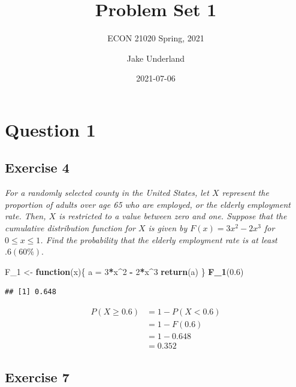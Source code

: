 \documentclass[
]{article}
\title{Problem Set 1}
\subtitle{ECON 21020 Spring, 2021}
\author{Jake Underland}
\date{2021-07-06}
\newenvironment{Shaded}{\begin{snugshade}}{\end{snugshade}}
\newcommand{\ControlFlowTok}[1]{\textcolor[rgb]{0.13,0.29,0.53}{\textbf{#1}}}
\newcommand{\DecValTok}[1]{\textcolor[rgb]{0.00,0.00,0.81}{#1}}
\newcommand{\FloatTok}[1]{\textcolor[rgb]{0.00,0.00,0.81}{#1}}
\newcommand{\KeywordTok}[1]{\textcolor[rgb]{0.13,0.29,0.53}{\textbf{#1}}}
\newcommand{\NormalTok}[1]{#1}
\newcommand{\OperatorTok}[1]{\textcolor[rgb]{0.81,0.36,0.00}{\textbf{#1}}}
\newcommand{\StringTok}[1]{\textcolor[rgb]{0.31,0.60,0.02}{#1}}
\begin{document}
\maketitle

{
\setcounter{tocdepth}{2}
\tableofcontents
}
\hypertarget{question-1}{%
\section{Question 1}\label{question-1}}

\hypertarget{exercise-4}{%
\subsection{Exercise 4}\label{exercise-4}}

\textit{For a randomly selected county in the United States, let $X$ represent the proportion of adults over age 65 who are employed, or the elderly employment rate. Then, $X$ is restricted to a value between zero and one. Suppose that the cumulative distribution function for $X$ is given by $F(x) = 3x^2 - 2x^3$ for $0 \leq x \leq 1$. Find the probability that the elderly employment rate is at least $.6(60\%)$}.

\begin{Shaded}
\begin{Highlighting}[]
\NormalTok{F_}\DecValTok{1}\NormalTok{ <-}\StringTok{ }\ControlFlowTok{function}\NormalTok{(x)\{}
\NormalTok{  a =}\StringTok{ }\DecValTok{3}\OperatorTok{*}\NormalTok{x}\OperatorTok{^}\DecValTok{2} \OperatorTok{-}\StringTok{ }\DecValTok{2}\OperatorTok{*}\NormalTok{x}\OperatorTok{^}\DecValTok{3}
  \KeywordTok{return}\NormalTok{(a)}
\NormalTok{\}}
\KeywordTok{F_1}\NormalTok{(}\FloatTok{0.6}\NormalTok{)}
\end{Highlighting}
\end{Shaded}

\begin{verbatim}
## [1] 0.648
\end{verbatim}

\[ \begin{aligned}
P(X \geq 0.6) &= 1 - P(X<0.6) \\
&= 1 - F(0.6) \\
&= 1 - 0.648 \\
&= 0.352
\end{aligned}\]

\hypertarget{exercise-7}{%
\subsection{Exercise 7}\label{exercise-7}}
\end{document}
